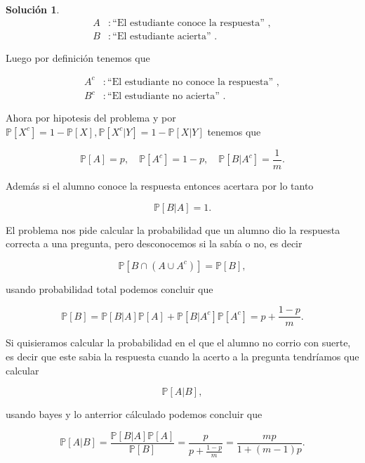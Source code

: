 \documentclass[letterpaper]{article}
\theoremstyle{definition}
\theoremstyle{lemathm}
\theoremstyle{lemathm}
\newtheorem{sol}{Solución}
\theoremstyle{lemathm}
\theoremstyle{lemademthm}
\newcommand{\pars}[1]{\left( #1 \right) }
\newcommand{\bracs}[1]{\left[ #1 \right] }
\newcommand{\PP}{\mathbb{P}}
\newcommand{\1}{\mathbbm{1}}
\begin{document}
\begin{enumerate}
\begin{sol}
			\begin{align*}
				A &: \text{``El estudiante conoce la respuesta'' },\\
				B &: \text{``El estudiante acierta'' }.
			\end{align*}

			Luego por definición tenemos que

			\begin{align*}
				A^c &: \text{``El estudiante no conoce la respuesta'' },\\
				B^c &: \text{``El estudiante no acierta'' }.
			\end{align*}

			Ahora por hipotesis del problema y por $\PP\bracs{X^c} = 1 - \PP\bracs{X}, \PP\bracs{X^c|Y} = 1 - \PP\bracs{X|Y}$ tenemos que

			\[\PP\bracs{A} = p, \quad \PP\bracs{A^c} = 1-p, \quad \PP\bracs{B|A^c} = \frac{1}{m}.\]

			Además si el alumno conoce la respuesta entonces acertara por lo tanto

			\[\PP\bracs{B|A} = 1.\]

			El problema nos pide calcular la probabilidad que un alumno dio la respuesta correcta a una pregunta, pero desconocemos si la sabía o no, es decir

			\[\PP\bracs{B\cap\pars{A\cup A^c}} = \PP\bracs{B},\]

			usando probabilidad total podemos concluir que

			\[\PP\bracs{B} = \PP\bracs{B|A}\PP\bracs{A}+\PP\bracs{B|A^c}\PP\bracs{A^c} = p+\frac{1-p}{m}.\]
			
			Si quisieramos calcular la probabilidad en el que el alumno no corrio con suerte, es decir que este sabia la respuesta cuando la acerto a la pregunta tendríamos que calcular

			\[\PP\bracs{A|B},\]

			usando bayes y lo anterrior cálculado podemos concluir que

			\[\PP\bracs{A|B} = \frac{\PP\bracs{B|A}\PP\bracs{A}}{\PP\bracs{B}} = \frac{p}{p+\frac{1-p}{m}} = \frac{mp}{1+\pars{m-1}p}.\]

			
		\end{sol}
	\end{enumerate}
\end{document}
